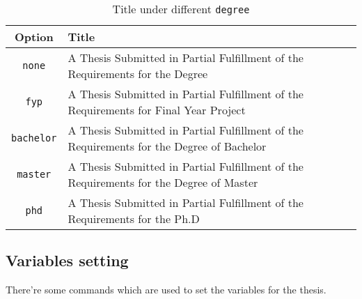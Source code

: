 \documentclass[12pt,a4paper,numbered,full]{l3doc}
\begin{document}
\begin{table}[ht]
    \centering
    \caption{Title under different \texttt{degree}}\label{tab:optdegree}
    \begin{tabularx}{\textwidth}{|c|X|}
    \hline
    \textbf{Option} & \textbf{Title}\\
    \hline
    \verb+none+  & A Thesis Submitted in Partial Fulfillment of the Requirements for the Degree \\ \hline
    \verb+fyp+ & A Thesis Submitted in Partial Fulfillment of the Requirements for Final Year Project \\ \hline
    \verb+bachelor+ & A Thesis Submitted in Partial Fulfillment of the Requirements for the Degree of Bachelor \\ \hline
    \verb+master+ & A Thesis Submitted in Partial Fulfillment of the Requirements for the Degree of Master \\ \hline
    \verb+phd+ & A Thesis Submitted in Partial Fulfillment of the Requirements for the Ph.D \\ \hline
    \end{tabularx}
\end{table}

\subsection{Variables setting}

There're some commands which are used to set the variables for the thesis.



\end{document}
